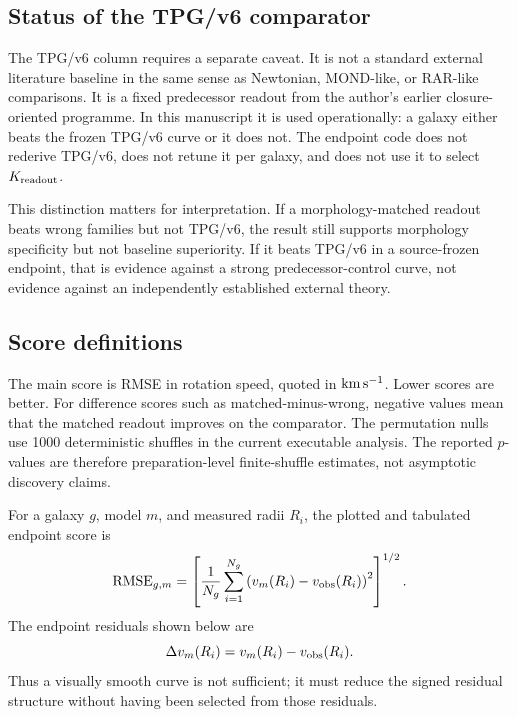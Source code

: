 \documentclass[11pt]{article}
\begin{document}
\subsection{Status of the TPG/v6 comparator}

The TPG/v6 column requires a separate caveat.  It is not a standard external
literature baseline in the same sense as Newtonian, MOND-like, or RAR-like
comparisons.  It is a fixed predecessor readout from the author's earlier
closure-oriented programme.  In this manuscript it is used operationally: a
galaxy either beats the frozen TPG/v6 curve or it does not.  The endpoint code
does not rederive TPG/v6, does not retune it per galaxy, and does not use it to
select \(K_{\rm readout}\).

\noindent{}

This distinction matters for interpretation.  If a morphology-matched readout
beats wrong families but not TPG/v6, the result still supports morphology
specificity but not baseline superiority.  If it beats TPG/v6 in a
source-frozen endpoint, that is evidence against a strong predecessor-control
curve, not evidence against an independently established external theory.

\subsection{Score definitions}

The main score is RMSE in rotation speed, quoted in \({\rm km\,s^{-1}}\).
Lower scores are better.  For difference scores such as matched-minus-wrong,
negative values mean that the matched readout improves on the comparator.  The
permutation nulls use 1000 deterministic shuffles in the current executable analysis.  The
reported \(p\)-values are therefore preparation-level finite-shuffle estimates,
not asymptotic discovery claims.

For a galaxy \(g\), model \(m\), and measured radii \(R_i\), the plotted and
tabulated endpoint score is
\[
{\rm RMSE}_{g,m}
 =
\left[
\frac{1}{N_g}
\sum_{i=1}^{N_g}
\left(v_m(R_i)-v_{\rm obs}(R_i)\right)^2
\right]^{1/2}.
\]
The endpoint residuals shown below are
\[
\Delta v_m(R_i)=v_m(R_i)-v_{\rm obs}(R_i).
\]
Thus a visually smooth curve is not sufficient; it must reduce the signed
residual structure without having been selected from those residuals.
\end{document}
